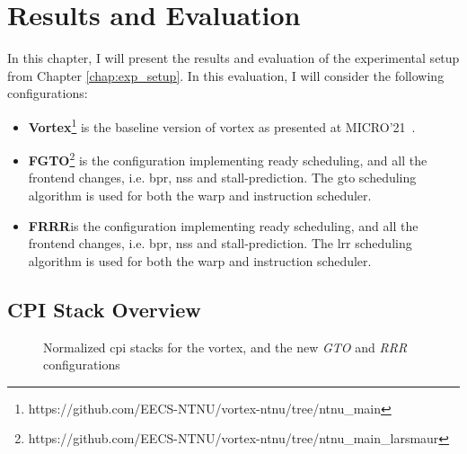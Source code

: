 \chapter{Results and Evaluation} \label{chap:results}

In this chapter, I will present the results and evaluation of the experimental setup from Chapter \ref{chap:exp_setup}. In this evaluation, I will consider the following configurations:

\begin{itemize}
    \item \textbf{Vortex}\footnote{https://github.com/EECS-NTNU/vortex-ntnu/tree/ntnu\_main} is the baseline version of \Gls{vortex} as presented at MICRO'21~\cite{vortex}.
    \item \textbf{FGTO}\footnote{\label{fn:gh_larsmaur}https://github.com/EECS-NTNU/vortex-ntnu/tree/ntnu\_main\_larsmaur} is the configuration implementing ready scheduling, and all the frontend changes, i.e. \acrshort{bpr}, \acrshort{nss} and stall-prediction. The \acrshort{gto} scheduling algorithm is used for both the warp and instruction scheduler.
    \item \textbf{FRRR}\footnotemark[2] is the configuration implementing ready scheduling, and all the frontend changes, i.e. \acrshort{bpr}, \acrshort{nss} and stall-prediction. The \acrshort{lrr} scheduling algorithm is used for both the warp and instruction scheduler.
\end{itemize}

\section{CPI Stack Overview}

\begin{figure}
    \centering
    \caption[Normalized \acrshort{cpi} stacks before and after the changes.]{Normalized \acrshort{cpi} stacks for the \Gls{vortex}, and the new \textit{GTO} and \textit{RRR} configurations}
    \label{fig:norm_cpi}
\end{figure}

